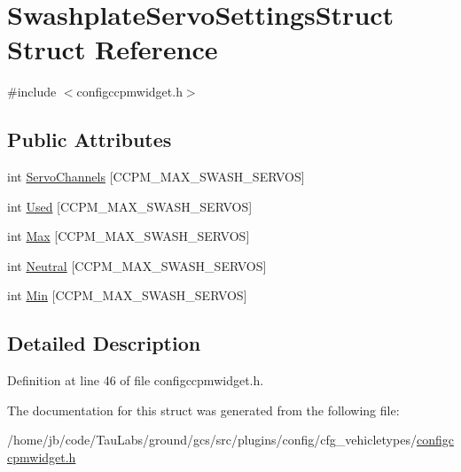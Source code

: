 \hypertarget{struct_swashplate_servo_settings_struct}{\section{\-Swashplate\-Servo\-Settings\-Struct \-Struct \-Reference}
\label{struct_swashplate_servo_settings_struct}
}


{\ttfamily \#include $<$configccpmwidget.\-h$>$}

\subsection*{\-Public \-Attributes}
\begin{DoxyCompactItemize}
\item 
int \hyperlink{group___config_plugin_ga86e55bfb2e22af5cf453931b3990d504}{\-Servo\-Channels} \mbox{[}\-C\-C\-P\-M\-\_\-\-M\-A\-X\-\_\-\-S\-W\-A\-S\-H\-\_\-\-S\-E\-R\-V\-O\-S\mbox{]}
\item 
int \hyperlink{group___config_plugin_ga9fda1ee21effccd7fcbad04816734eac}{\-Used} \mbox{[}\-C\-C\-P\-M\-\_\-\-M\-A\-X\-\_\-\-S\-W\-A\-S\-H\-\_\-\-S\-E\-R\-V\-O\-S\mbox{]}
\item 
int \hyperlink{group___config_plugin_ga30259c7dfef707f2d0999fed8adaf6b1}{\-Max} \mbox{[}\-C\-C\-P\-M\-\_\-\-M\-A\-X\-\_\-\-S\-W\-A\-S\-H\-\_\-\-S\-E\-R\-V\-O\-S\mbox{]}
\item 
int \hyperlink{group___config_plugin_gad228ac505087eafb0d00d4aab3b3e76d}{\-Neutral} \mbox{[}\-C\-C\-P\-M\-\_\-\-M\-A\-X\-\_\-\-S\-W\-A\-S\-H\-\_\-\-S\-E\-R\-V\-O\-S\mbox{]}
\item 
int \hyperlink{group___config_plugin_ga68b64812e9062f2c280eebb8ad8961c4}{\-Min} \mbox{[}\-C\-C\-P\-M\-\_\-\-M\-A\-X\-\_\-\-S\-W\-A\-S\-H\-\_\-\-S\-E\-R\-V\-O\-S\mbox{]}
\end{DoxyCompactItemize}


\subsection{\-Detailed \-Description}


\-Definition at line 46 of file configccpmwidget.\-h.



\-The documentation for this struct was generated from the following file\-:\begin{DoxyCompactItemize}
\item 
/home/jb/code/\-Tau\-Labs/ground/gcs/src/plugins/config/cfg\-\_\-vehicletypes/\hyperlink{configccpmwidget_8h}{configccpmwidget.\-h}\end{DoxyCompactItemize}
